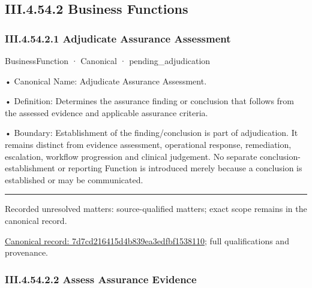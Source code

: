 \subsection*{III.4.54.2 Business Functions}
\label{navigation:III.4.54.2}

\subsubsection*{III.4.54.2.1 Adjudicate Assurance Assessment}
\label{navigation:III.4.54.2.1}

\label{element:7d7cd216415d4b839ea3edfbf1538110}
{\small BusinessFunction · Canonical · pending\_adjudication}\par

•
Canonical Name: Adjudicate Assurance Assessment.



•
Definition: Determines the assurance finding or conclusion that follows from the assessed evidence and applicable assurance criteria.



•
Boundary: Establishment of the finding/conclusion is part of adjudication. It remains distinct from evidence assessment, operational response, remediation, escalation, workflow progression and clinical judgement. No separate conclusion-establishment or reporting Function is introduced merely because a conclusion is established or may be communicated.



\medskip\hrule\medskip

{\small Recorded unresolved matters: source-qualified matters; exact scope remains in the canonical record.}\par
{\footnotesize \href{../../../../continuum/business/business-function/7d7cd216415d4b839ea3edfbf1538110.md}{Canonical record: 7d7cd216415d4b839ea3edfbf1538110}; full qualifications and provenance.}\par
\subsubsection*{III.4.54.2.2 Assess Assurance Evidence}
\label{navigation:III.4.54.2.2}

